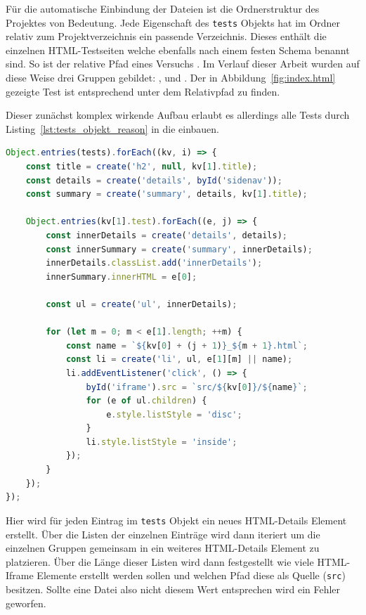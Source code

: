 Für die automatische Einbindung der Dateien ist die Ordnerstruktur des Projektes von Bedeutung.
Jede Eigenschaft des \lstinline{tests} Objekts hat im  Ordner relativ zum Projektverzeichnis ein passende Verzeichnis.
Dieses enthält die einzelnen HTML-Testseiten welche ebenfalls nach einem festen Schema benannt sind.
So ist der relative Pfad eines Versuchs .
Im Verlauf dieser Arbeit wurden auf diese Weise drei Gruppen gebildet: ,  und .
Der in Abbildung~\ref{fig:index.html} gezeigte Test ist entsprechend unter dem Relativpfad  zu finden.

Dieser zunächst komplex wirkende Aufbau erlaubt es allerdings alle Tests durch Listing~\ref{lst:tests_objekt_reason} in die  einbauen.

\begin{lstlisting}[language=JavaScript, caption={Iteration über das tests Objekt zur Population der index.html.}, label={lst:tests_objekt_reason}]
Object.entries(tests).forEach((kv, i) => {
    const title = create('h2', null, kv[1].title);
    const details = create('details', byId('sidenav'));
    const summary = create('summary', details, kv[1].title);

    Object.entries(kv[1].test).forEach((e, j) => {
        const innerDetails = create('details', details);
        const innerSummary = create('summary', innerDetails);
        innerDetails.classList.add('innerDetails');
        innerSummary.innerHTML = e[0];

        const ul = create('ul', innerDetails);

        for (let m = 0; m < e[1].length; ++m) {
            const name = `${kv[0] + (j + 1)}_${m + 1}.html`;
            const li = create('li', ul, e[1][m] || name);
            li.addEventListener('click', () => {
                byId('iframe').src = `src/${kv[0]}/${name}`;
                for (e of ul.children) {
                    e.style.listStyle = 'disc';
                }
                li.style.listStyle = 'inside';
            });
        }
    });
});
\end{lstlisting}

Hier wird für jeden Eintrag im \lstinline{tests} Objekt ein neues HTML-Details Element erstellt. %
Über die Listen der einzelnen Einträge wird dann iteriert um die einzelnen Gruppen gemeinsam in ein weiteres HTML-Details Element zu platzieren.
Über die Länge dieser Listen wird dann festgestellt wie viele HTML-Iframe Elemente erstellt werden sollen und welchen Pfad diese als Quelle (\lstinline{src}) besitzen.
Sollte eine Datei also nicht diesem Wert entsprechen wird ein Fehler geworfen.

